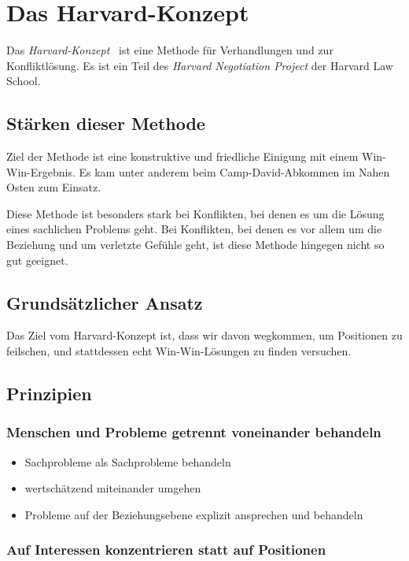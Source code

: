 \section{Das Harvard-Konzept}
\label{harvard-konzept}

Das \emph{Harvard-Konzept}~\cite{harvard-konzept} ist eine Methode für Verhandlungen und zur Konfliktlösung. Es ist ein Teil des \emph{Harvard Negotiation Project} der Harvard Law School.


\subsection{Stärken dieser Methode}

Ziel der Methode ist eine konstruktive und friedliche Einigung mit einem Win-Win-Ergebnis. Es kam unter anderem beim Camp-David-Abkommen im Nahen Osten zum Einsatz.

Diese Methode ist besonders stark bei Konflikten, bei denen es um die Lösung eines sachlichen Problems geht. Bei Konflikten, bei denen es vor allem um die Beziehung und um verletzte Gefühle geht, ist diese Methode hingegen nicht so gut geeignet.


\subsection{Grundsätzlicher Ansatz}

Das Ziel vom Harvard-Konzept ist, dass wir davon wegkommen, um Positionen zu feilschen, und stattdessen echt Win-Win-Lösungen zu finden versuchen.


\subsection{Prinzipien}


\subsubsection{Menschen und Probleme getrennt voneinander behandeln}

\begin{itemize}
  \item Sachprobleme als Sachprobleme behandeln
  \item wertschätzend miteinander umgehen
  \item Probleme auf der Beziehungsebene explizit ansprechen und behandeln
\end{itemize}


\subsubsection{Auf Interessen konzentrieren statt auf Positionen}

